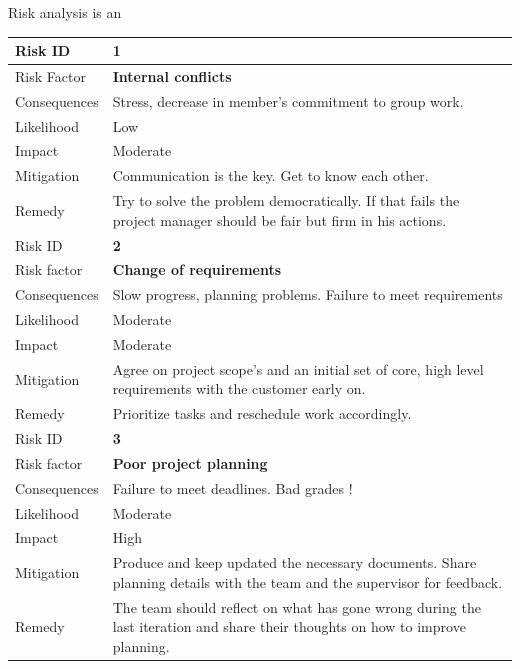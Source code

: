 Risk analysis is an

\begin{table}[h]
\begin{tabular}{ | l | p{11.5cm} | }

  \hline
  Risk ID & \textbf{1} \\
  \hline\noalign{\smallskip}\noalign{\smallskip}\hline
  Risk Factor   & \textbf{Internal conflicts} \\
  Consequences  & Stress, decrease in member’s commitment to group work.\\
  Likelihood    & Low \\
  Impact        & Moderate \\
  Mitigation    & Communication is the key. Get to know each other. \\
  Remedy        & Try to solve the problem democratically. \newline
                If that fails the project manager should be fair but firm in his actions. \\
  \hline
  
  \hline\noalign{\smallskip}\noalign{\smallskip}\hline
  Risk ID & \textbf{2} \\
  \hline\noalign{\smallskip}\noalign{\smallskip}\hline
  Risk factor   & \textbf{Change of requirements} \\
  Consequences  & Slow progress, planning problems. Failure to meet requirements \\
  Likelihood    & Moderate \\
  Impact        & Moderate \\
  Mitigation    & Agree on project scope’s and an initial set of core, high level requirements with the customer early on. \\
  Remedy        & Prioritize tasks and reschedule work accordingly. \\
  \hline

  \hline\noalign{\smallskip}\noalign{\smallskip}\hline
  Risk ID & \textbf{3} \\
  \hline\noalign{\smallskip}\noalign{\smallskip}\hline
  Risk factor   & \textbf{Poor project planning} \\
  Consequences  & Failure to meet deadlines. Bad grades !\\
  Likelihood    & Moderate \\
  Impact        & High \\
  Mitigation    & Produce and keep updated the necessary documents.
                Share planning details with the team and the supervisor for feedback. \\
  Remedy        & The team should reflect on what has gone wrong during the last iteration and
                share their thoughts on how to improve planning. \\
  \hline


\end{tabular}
\end{table}
